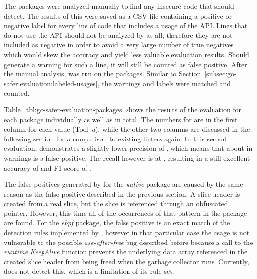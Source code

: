 

The  packages were analyzed manually to find any insecure code that \toolSafer{} should detect.
The results of this were saved as a \acrshort{CSV} file containing a positive or negative label for every line of code
that includes a usage of the \unsafe{} \acrshort{API}.
Lines that do not use the \acrshort{API} should not be analyzed by \toolSafer{} at all, therefore they are not included
as negative in order to avoid a very large number of true negatives which would skew the accuracy and yield less
valuable evaluation results.
Should \toolSafer{} generate a warning for such a line, it will still be counted as false positive.
After the manual analysis, \toolSafer{} was run on the packages.
Similar to Section~\ref{subsec:go-safer:evaluation:labeled-usages}, the warnings and labels were matched and counted.



Table~\ref{tbl:go-safer-evaluation-packages} shows the results of the evaluation for each package individually as well
as in total.
The numbers for \toolSafer{} are in the first column for each value (Tool~\textit{a}), while the other two columns are
discussed in the following section for a comparison to existing linters again.
In this second evaluation, \toolSafer{} demonstrates a slightly lower precision of , which means that
about  in  warnings is a false positive.
The recall however is at , resulting in a still excellent accuracy of  and F1-score of
.

The false positives generated by \toolSafer{} for the \textit{native} package are caused by the same reason as the false
positive described in the previous section.
A slice header is created from a real slice, but the slice is referenced through an obfuscated pointer.
However, this time all of the occurrences of that pattern in the package are found.
For the \textit{ebpf} package, the false positive is an exact match of the detection rules implemented by \toolSafer{},
however in that particular case the usage is not vulnerable to the possible \textit{use-after-free} bug described before
because a call to the \textit{runtime.KeepAlive} function prevents the underlying data array referenced in the created
slice header from being freed when the garbage collector runs.
Currently, \toolSafer{} does not detect this, which is a limitation of its rule set.

